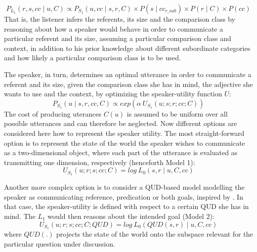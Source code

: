 \begin{equation}
P_{L_1} (r, s, cc \mid u, C) \propto P_{S_1} (u, cc \mid s, r, C) \times P(s \mid cc_{r\_sub}) \times P(r \mid C) \times P(cc)
\end{equation}
That is, the listener infers the referents, its size and the comparison class by reasoning about how a speaker would behave in order to communicate a particular referent and its size, assuming a particular comparison class and context, in addition to his prior knowledge about different subordinate categories and how likely a particular comparison class is to be used.  %

The speaker, in turn, determines an optimal utterance in order to communicate a referent and its size, given the comparison class she has in mind, the adjective she wants to use and the context, by optimizing the speaker-utility function $U$:
\begin{equation}
P_{S_1} (u \mid s, r, cc, C)  \propto exp(\alpha \: U_{S_1}(u; s; r; cc; C)) 
\end{equation}
The cost of producing uterances $C(u)$ is assumed to be uniform over all possible utterances and can therefore be neglected. 
Now different options are considered here how to represent the speaker utility. 
The most straight-forward option is to represent the state of the world the speaker wishes to communicate as a two-dimensional object, where each part of the utterance is evaluated as transmitting one dimension, respectively (henceforth Model 1): 
\begin{equation}
U_{S_1} (u; r; s; cc; C) = log \: L_0 (s, r \mid u, C, cc) 
\end{equation}

Another more complex option is to consider a QUD-based model modelling the speaker as communicating reference, predication or both goals, inspired by \textcite{kao2014nonliteral}. In that case, the speaker-utility is defined with respect to a certain QUD she has in mind. The $L_1$ would then reasons about the intended goal (Model 2):
\begin{equation}
U_{S_1} (u; r; s; cc; C; QUD) = log \: L_0(QUD(s, r) \mid u, C, cc)
\end{equation} 
where $QUD(.)$ projects the state of the world onto the subspace relevant for the particular question under discussion. 

